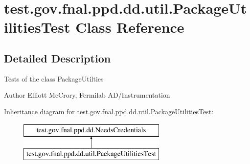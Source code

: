 \hypertarget{classtest_1_1gov_1_1fnal_1_1ppd_1_1dd_1_1util_1_1PackageUtilitiesTest}{\section{test.\-gov.\-fnal.\-ppd.\-dd.\-util.\-Package\-Utilities\-Test Class Reference}
\label{classtest_1_1gov_1_1fnal_1_1ppd_1_1dd_1_1util_1_1PackageUtilitiesTest}
}


\subsection{Detailed Description}
Tests of the class Package\-Utilties

\begin{DoxyAuthor}{Author}
Elliott Mc\-Crory, Fermilab A\-D/\-Instrumentation 
\end{DoxyAuthor}
Inheritance diagram for test.\-gov.\-fnal.\-ppd.\-dd.\-util.\-Package\-Utilities\-Test\-:\begin{figure}[H]
\begin{center}
\leavevmode
\includegraphics[height=2.000000cm]{classtest_1_1gov_1_1fnal_1_1ppd_1_1dd_1_1util_1_1PackageUtilitiesTest}
\end{center}
\end{figure}
